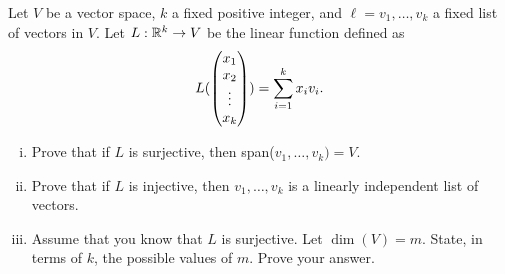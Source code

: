 \begin{question}\label{que:CoordinateFunction}
	\normalfont
	
		
	Let $V$ be a vector space, $k$ a fixed positive integer, and $\ell = v_1,\dots, v_k$ a fixed list of vectors in $V$. Let $L:{\mathbb R}^k\to V$ be the linear function defined as
	\begin{align}\label{eq:LCoordinateMap}
		L(\begin{pmatrix} x_1\\ x_2\\\vdots \\ x_k\end{pmatrix}) = \sum_{i=1}^k x_iv_i.
	\end{align}
	
	\begin{enumerate}[(i)]
		\item Prove that if $L$ is surjective, then span($v_1,\dots, v_k) = V$.
		
		\item Prove that if $L$ is injective, then $v_1,\dots, v_k$ is a linearly independent list of vectors.
		
		\item Assume that you know that $L$ is surjective.  Let $\dim(V)=m$. State, in terms of $k$, the possible values of $m$.  Prove your answer.
		
		
	\end{enumerate}
\end{question}